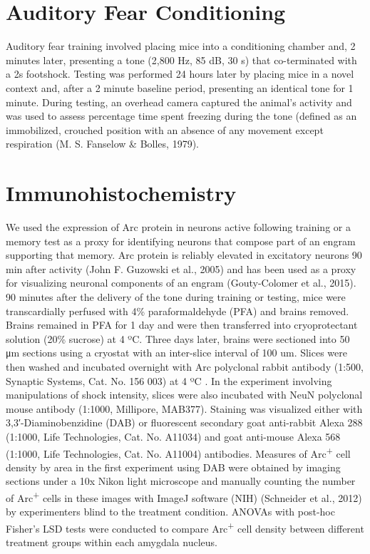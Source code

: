 \documentclass[12pt,a4paperpaper,]{report}
\begin{document}
\section{Auditory Fear Conditioning}\label{auditory-fear-conditioning}

Auditory fear training involved placing mice into a conditioning chamber
and, 2 minutes later, presenting a tone (2,800 Hz, 85 dB, 30 s) that
co-terminated with a 2s footshock. Testing was performed 24 hours later
by placing mice in a novel context and, after a 2 minute baseline
period, presenting an identical tone for 1 minute. During testing, an
overhead camera captured the animal's activity and was used to assess
percentage time spent freezing during the tone (defined as an
immobilized, crouched position with an absence of any movement except
respiration (M. S. Fanselow \& Bolles, 1979).

\section{Immunohistochemistry}\label{immunohistochemistry}

We used the expression of Arc protein in neurons active following
training or a memory test as a proxy for identifying neurons that
compose part of an engram supporting that memory. Arc protein is
reliably elevated in excitatory neurons 90 min after activity (John F.
Guzowski et al., 2005) and has been used as a proxy for visualizing
neuronal components of an engram (Gouty-Colomer et al., 2015). 90
minutes after the delivery of the tone during training or testing, mice
were transcardially perfused with 4\% paraformaldehyde (PFA) and brains
removed. Brains remained in PFA for 1 day and were then transferred into
cryoprotectant solution (20\% sucrose) at 4 ºC. Three days later, brains
were sectioned into 50 μm sections using a cryostat with an inter-slice
interval of 100 um. Slices were then washed and incubated overnight with
Arc polyclonal rabbit antibody (1:500, Synaptic Systems, Cat. No. 156
003) at 4 ºC . In the experiment involving manipulations of shock
intensity, slices were also incubated with NeuN polyclonal mouse
antibody (1:1000, Millipore, MAB377). Staining was visualized either
with 3,3′-Diaminobenzidine (DAB) or fluorescent secondary goat
anti-rabbit Alexa 288 (1:1000, Life Technologies, Cat. No. A11034) and
goat anti-mouse Alexa 568 (1:1000, Life Technologies, Cat. No. A11004)
antibodies. Measures of Arc\textsuperscript{+} cell density by area in
the first experiment using DAB were obtained by imaging sections under a
10x Nikon light microscope and manually counting the number of
Arc\textsuperscript{+} cells in these images with ImageJ software (NIH)
(Schneider et al., 2012) by experimenters blind to the treatment
condition. ANOVAs with post-hoc Fisher's LSD tests were conducted to
compare Arc\textsuperscript{+} cell density between different treatment
groups within each amygdala nucleus.
\end{document}
